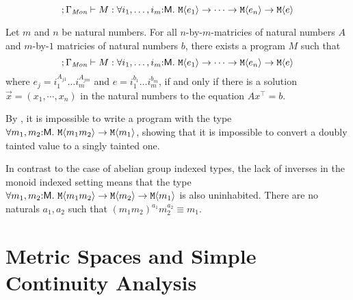 
\begin{theorem}
  \begin{equation}
    \label{eq:fo-monoid-type-insensitive}
    ; \Gamma_\Mon \vdash M : \forall i_1,\dots,i_m\mathord:\mathsf{M}.\ \tyPrim{M}{e_1} \to \dots \to \tyPrim{M}{e_n} \to \tyPrim{M}{e}
  \end{equation}
  
\end{theorem}

\begin{theorem}
  \label{thm:monoid-indefinability}
  Let $m$ and $n$ be natural numbers. For all $n$-by-$m$-matricies of
  natural numbers $A$ and $m$-by-$1$ matricies of natural numbers $b$,
  there exists a program $M$ such that
  \begin{displaymath}
    \label{eq:fo-monoid-type}
    ; \Gamma_\Mon \vdash M : \forall i_1,\dots,i_m\mathord:\mathsf{M}.\ \tyPrim{M}{e_1} \to \dots \to \tyPrim{M}{e_n} \to \tyPrim{M}{e}
  \end{displaymath}
  where $e_j = i_1^{A_{j1}}\dots i_m^{A_{jm}}$ and $e =
  i_1^{b_1}\dots i_m^{b_m}$, if and only if there is a solution
  $\vec{x} = (x_1,\cdots,x_n)$ in the natural numbers to the equation
  $A x^\top = b$.
\end{theorem}

\begin{example}
  By , it is impossible to write a
  program with the type $\forall m_1,m_2 \mathord: \mathsf{M}.\
  \textup{\texttt{M}}\langle m_1m_2 \rangle \to \textup{\texttt{M}}\langle m_1 \rangle$, showing that it is
  impossible to convert a doubly tainted value to a singly tainted
  one.

  In contrast to the case of abelian group indexed types, the lack of
  inverses in the monoid indexed setting means that the type $\forall
  m_1,m_2\mathord:\mathsf{M}.\ \textup{\texttt{M}}\langle m_1m_2 \rangle \to \textup{\texttt{M}}\langle m_2 \rangle
  \to \textup{\texttt{M}}\langle m_1 \rangle$ is also uninhabited. There are no naturals
  $a_1,a_2$ such that $(m_1m_2)^{a_1}m_2^{a_2} \equiv m_1$.
\end{example}


\section{Metric Spaces and Simple Continuity Analysis}
\label{sec:continuity-analysis}

